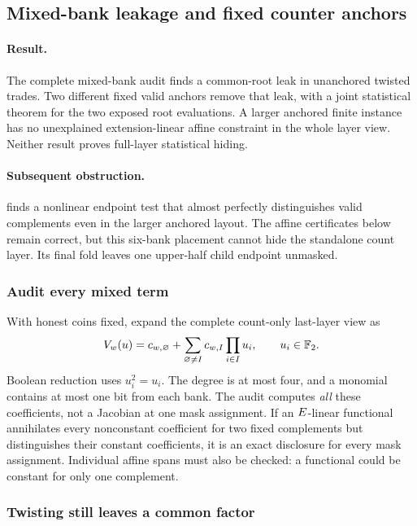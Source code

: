 \subsection{Mixed-bank leakage and fixed counter anchors}\label{note:zk-count-mixed}

\paragraph{Result.} The complete mixed-bank audit finds a common-root leak in unanchored twisted trades. Two different fixed valid anchors remove that leak, with a joint statistical theorem for the two exposed root evaluations. A larger anchored finite instance has no unexplained extension-linear affine constraint in the whole layer view. Neither result proves full-layer statistical hiding.

\paragraph{Subsequent obstruction.}  finds a nonlinear endpoint test that almost perfectly distinguishes valid complements even in the larger anchored layout. The affine certificates below remain correct, but this six-bank placement cannot hide the standalone count layer. Its final fold leaves one upper-half child endpoint unmasked.

\subsubsection{Audit every mixed term}

With honest coins fixed, expand the complete count-only last-layer view as
\[
 V_w(u)=c_{w,\varnothing}+\sum_{\varnothing\ne I}c_{w,I}\prod_{i\in I}u_i,
 \qquad u_i\in\mathbb{F}_2.
\]
Boolean reduction uses $u_i^2=u_i$. The degree is at most four, and a monomial contains at most one bit from each bank. The audit computes \emph{all} these coefficients, not a Jacobian at one mask assignment. If an $E$-linear functional annihilates every nonconstant coefficient for two fixed complements but distinguishes their constant coefficients, it is an exact disclosure for every mask assignment. Individual affine spans must also be checked: a functional could be constant for only one complement.

\subsubsection{Twisting still leaves a common factor}

